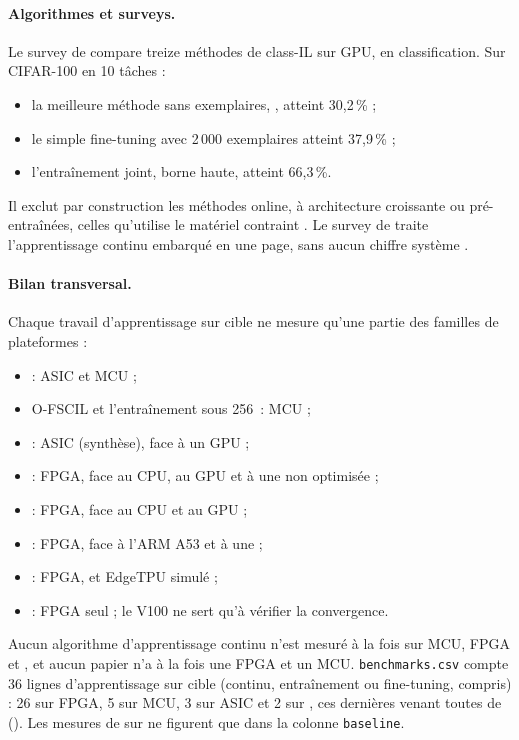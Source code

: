 \paragraph{Algorithmes et surveys.} Le survey de
\citet{arxiv-2010.15277-class-incremental-learning-survey-performance}\pp{} compare treize
méthodes de class-IL sur GPU, en classification. Sur CIFAR-100 en 10 tâches
 :
\begin{itemize}
  \item la meilleure méthode sans exemplaires, , atteint 30,2\,\% ;
  \item le simple fine-tuning avec 2\,000 exemplaires atteint 37,9\,\% ;
  \item l'entraînement joint, borne haute, atteint 66,3\,\%.
\end{itemize}
Il exclut par construction les méthodes online, à architecture croissante ou
pré-entraînées, celles qu'utilise le matériel contraint . Le survey de
\citet{arxiv-2411.01431-efficient-deep-learning-infrastructures-embedded} traite
l'apprentissage continu embarqué en une page, sans aucun chiffre système .

\paragraph{Bilan transversal.} Chaque travail d'apprentissage sur cible ne mesure qu'une
partie des familles de plateformes :
\begin{itemize}
  \item {} : ASIC et MCU ;
  \item O-FSCIL et l'entraînement sous 256\, : MCU ;
  \item {} : ASIC (synthèse), face à un GPU ;
  \item {} : FPGA, face au CPU, au GPU et à une  non optimisée ;
  \item {} : FPGA, face au CPU et au GPU ;
  \item {} : FPGA, face à l'ARM A53 et à une 
    \citep[Table~IV]{2021-piyasena-accelerating-continual-learning-edge-fpga} ;
  \item {} : FPGA,  et EdgeTPU simulé
    \citep[Table~VI]{2024-aggarwal-chameleon-dual-memory-replay-online} ;
  \item {} : FPGA seul ; le V100 ne sert qu'à vérifier la convergence.
\end{itemize}
Aucun algorithme d'apprentissage continu n'est mesuré à la fois sur MCU, FPGA et , et
aucun papier n'a à la fois une FPGA et un MCU. \texttt{benchmarks.csv} compte 36 lignes
d'apprentissage sur cible (continu, entraînement ou fine-tuning,  compris) : 26 sur
FPGA, 5 sur MCU, 3 sur ASIC et 2 sur , ces dernières venant toutes de 
(). Les mesures de  sur  ne figurent que dans la colonne
\texttt{baseline}.
